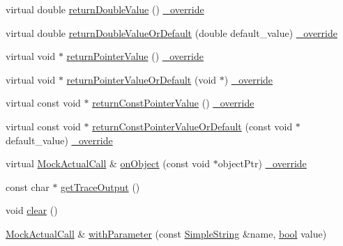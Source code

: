\begin{DoxyCompactItemize}
\item 
virtual double \hyperlink{class_mock_actual_call_trace_a92e3571079d06427fff18c118ccb352b}{return\+Double\+Value} () \hyperlink{_cpp_u_test_config_8h_a049bea15dd750e15869863c94c1efc3b}{\+\_\+override}
\item 
virtual double \hyperlink{class_mock_actual_call_trace_a49d7dc86b0e458722e34883078622450}{return\+Double\+Value\+Or\+Default} (double default\+\_\+value) \hyperlink{_cpp_u_test_config_8h_a049bea15dd750e15869863c94c1efc3b}{\+\_\+override}
\item 
virtual void $\ast$ \hyperlink{class_mock_actual_call_trace_a16396f85804380c580c6783f2fb63af2}{return\+Pointer\+Value} () \hyperlink{_cpp_u_test_config_8h_a049bea15dd750e15869863c94c1efc3b}{\+\_\+override}
\item 
virtual void $\ast$ \hyperlink{class_mock_actual_call_trace_aa39a987d15c9bb3cc3b4858254d904b6}{return\+Pointer\+Value\+Or\+Default} (void $\ast$) \hyperlink{_cpp_u_test_config_8h_a049bea15dd750e15869863c94c1efc3b}{\+\_\+override}
\item 
virtual const void $\ast$ \hyperlink{class_mock_actual_call_trace_abbff97f8af6ab7acb912ba62b912a457}{return\+Const\+Pointer\+Value} () \hyperlink{_cpp_u_test_config_8h_a049bea15dd750e15869863c94c1efc3b}{\+\_\+override}
\item 
virtual const void $\ast$ \hyperlink{class_mock_actual_call_trace_acb5d9810c30b2894f68e201cb70e19ed}{return\+Const\+Pointer\+Value\+Or\+Default} (const void $\ast$default\+\_\+value) \hyperlink{_cpp_u_test_config_8h_a049bea15dd750e15869863c94c1efc3b}{\+\_\+override}
\item 
virtual \hyperlink{class_mock_actual_call}{Mock\+Actual\+Call} \& \hyperlink{class_mock_actual_call_trace_a05622f91f6d99311dedb4a2f821c12b2}{on\+Object} (const void $\ast$object\+Ptr) \hyperlink{_cpp_u_test_config_8h_a049bea15dd750e15869863c94c1efc3b}{\+\_\+override}
\item 
const char $\ast$ \hyperlink{class_mock_actual_call_trace_a41afc07dfa2704555664ed1796bebdba}{get\+Trace\+Output} ()
\item 
void \hyperlink{class_mock_actual_call_trace_ac8bb3912a3ce86b15842e79d0b421204}{clear} ()
\item 
\hyperlink{class_mock_actual_call}{Mock\+Actual\+Call} \& \hyperlink{class_mock_actual_call_a158f3ada8f73127b977d5353d4e4dea0}{with\+Parameter} (const \hyperlink{class_simple_string}{Simple\+String} \&name, \hyperlink{avb__gptp_8h_af6a258d8f3ee5206d682d799316314b1}{bool} value)
\item 

\end{DoxyCompactItemize}
